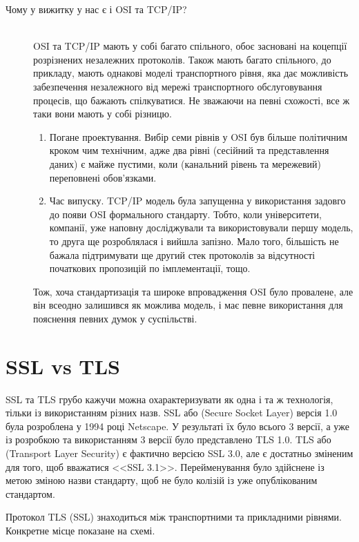 \begin{description}
        \item[Чому у вижитку у нас є і OSI та TCP/IP?] \hfill \\

        OSI та TCP/IP мають у собі багато спільного, обоє засновані на коцепції розрізнених незалежних протоколів. Також мають багато спільного, до прикладу, мають однакові моделі транспортного рівня, яка дає можливість забезпечення незалежного від мережі транспортного обслуговування процесів, що бажають спілкуватися. Не зважаючи на певні схожості, все ж таки вони мають у собі різницю.
        \begin{enumerate}
            \item Погане проектування. Вибір семи рівнів у OSI був більше політичним кроком чим технічним, адже два рівні (сесійний та представлення даних) є майже пустими, коли (канальний рівень та мережевий) переповнені обов'язками. 
            \item Час випуску. TCP/IP модель була запущенна у використання задовго до появи OSI формального стандарту. Тобто, коли університети, компанії, уже наповну досліджували та використовували першу модель, то друга ще розроблялася і вийшла запізно. Мало того, більшість не бажала підтримувати ще другий стек протоколів за відсутності початкових пропозицій по імплементації, тощо.
        \end{enumerate}
        Тож, хоча стандартизація та широке впровадження OSI було провалене, але він всеодно залишився як можлива модель, і має певне використання для пояснення певних думок у суспільстві. 
    \end{description}

\section{SSL vs TLS}

SSL та TLS грубо кажучи можна охарактеризувати як одна і та ж технологія, тільки із використанням різних назв. SSL або (Secure Socket Layer) версія 1.0 була розроблена у 1994 році Netscape. У результаті їх було всього 3 версії, а уже із розробкою та використанням 3 версії було представлено TLS 1.0. TLS або (Transport Layer Security) є фактично версією SSL 3.0, але є достатньо зміненим для того, щоб вважатися <<SSL 3.1>>. Перейменування було здійснене із метою зміною назви стандарту, щоб не було колізій із уже опублікованим стандартом. 

Протокол TLS (SSL) знаходиться між транспортними та прикладними рівнями. Конкретне місце показане на схемі.

